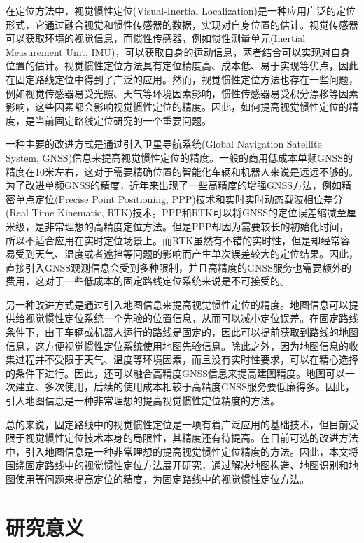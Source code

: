 在定位方法中，视觉惯性定位(Visual-Inertial Localization)是一种应用广泛的定位形式，它通过融合视觉和惯性传感器的数据，实现对自身位置的估计。视觉传感器可以获取环境的视觉信息，而惯性传感器，例如惯性测量单元(Inertial Measurement Unit, IMU)，可以获取自身的运动信息，两者结合可以实现对自身位置的估计。视觉惯性定位方法具有定位精度高、成本低、易于实现等优点，因此在固定路线定位中得到了广泛的应用。然而，视觉惯性定位方法也存在一些问题，例如视觉传感器易受光照、天气等环境因素影响，惯性传感器易受积分漂移等因素影响，这些因素都会影响视觉惯性定位的精度。因此，如何提高视觉惯性定位的精度，是当前固定路线定位研究的一个重要问题。

一种主要的改进方式是通过引入卫星导航系统(Global Navigation Satellite System, GNSS)信息来提高视觉惯性定位的精度。一般的商用低成本单频GNSS的精度在10米左右，这对于需要精确位置的智能化车辆和机器人来说是远远不够的。为了改进单频GNSS的精度，近年来出现了一些高精度的增强GNSS方法，例如精密单点定位(Precise Point Positioning, PPP)\cite{zumberge1997precise}技术和实时实时动态载波相位差分(Real Time Kinematic, RTK)\cite{fotopoulos2001overview}技术。PPP和RTK可以将GNSS的定位误差缩减至厘米级，是非常理想的高精度定位方法。但是PPP却因为需要较长的初始化时间\cite{bisnath2018innovation}，所以不适合应用在实时定位场景上。而RTK虽然有不错的实时性，但是却经常容易受到天气、温度或者遮挡等问题的影响而产生单次误差较大的定位结果\cite{li2022review}。因此，直接引入GNSS观测信息会受到多种限制，并且高精度的GNSS服务也需要额外的费用，这对于一些低成本的固定路线定位系统来说是不可接受的。

另一种改进方式是通过引入地图信息来提高视觉惯性定位的精度。地图信息可以提供给视觉惯性定位系统一个先验的位置信息，从而可以减小定位误差。在固定路线条件下，由于车辆或机器人运行的路线是固定的，因此可以提前获取到路线的地图信息，这方便视觉惯性定位系统使用地图先验信息。除此之外，因为地图信息的收集过程并不受限于天气、温度等环境因素，而且没有实时性要求，可以在精心选择的条件下进行。因此，还可以融合高精度GNSS信息来提高建图精度。地图可以一次建立、多次使用，后续的使用成本相较于高精度GNSS服务要低廉得多。因此，引入地图信息是一种非常理想的提高视觉惯性定位精度的方法。

总的来说，固定路线中的视觉惯性定位是一项有着广泛应用的基础技术，但目前受限于视觉惯性定位技术本身的局限性，其精度还有待提高。在目前可选的改进方法中，引入地图信息是一种非常理想的提高视觉惯性定位精度的方法。因此，本文将围绕固定路线中的视觉惯性定位方法展开研究，通过解决地图构造、地图识别和地图使用等问题来提高定位的精度，为固定路线中的视觉惯性定位方法。


\section{研究意义}

